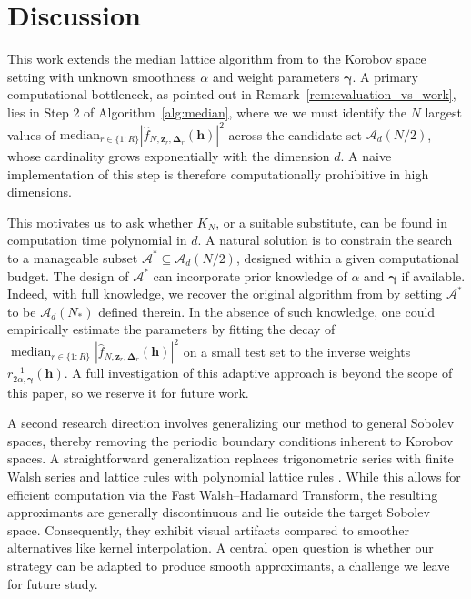 \documentclass[a4paper,11pt]{article}
\newcommand{\bsh}{\boldsymbol{h}}
\newcommand{\bsz}{\boldsymbol{z}}
\newcommand{\bsgamma}{\boldsymbol{\gamma}}
\newcommand{\bsDelta}{\boldsymbol{\Delta}}
\newcommand{\Acal}{\mathcal{A}}
\begin{document}
\section{Discussion}\label{sec:discussion}

This work extends the median lattice algorithm from \cite{PKG24} to the Korobov space setting with unknown smoothness $\alpha$ and weight parameters $\bsgamma$. A primary computational bottleneck, as pointed out in Remark~\ref{rem:evaluation_vs_work}, lies in Step 2 of Algorithm~\ref{alg:median}, where we we must identify the $N$ largest values of $\mathrm{median}_{r\in\{1{:}R\}}|\widehat{f}_{N,\bsz_r,\bsDelta_r}(\bsh)|^2$ across the candidate set $\Acal_{d}(N/2)$, whose cardinality grows exponentially with the dimension $d$. A naive implementation of this step is therefore computationally prohibitive in high dimensions.

This motivates us to ask whether $K_N$, or a suitable substitute, can be found in computation time polynomial in $d$. A natural solution is to constrain the search to a manageable subset $\Acal^*\subseteq \Acal_{d}(N/2)$, designed within a given computational budget. The design of $\Acal^*$ can incorporate prior knowledge of $\alpha$ and $\bsgamma$ if available. Indeed, with full knowledge, we recover the original algorithm from \cite{PKG24} by setting $\Acal^*$ to be $\Acal_d(N_*)$ defined therein.  In the absence of such knowledge, one could empirically estimate the parameters by fitting the decay of $\operatorname*{median}_{r\in\{1{:}R\}}| \widehat{f}_{N,\bsz_r,\bsDelta_r}(\bsh)|^2$ on a small test set to the inverse weights $r^{-1}_{2\alpha,\bsgamma}(\bsh)$. A full investigation of this adaptive approach is beyond the scope of this paper, so we reserve it for future work.

A second research direction involves generalizing our method to general Sobolev spaces, thereby removing the periodic boundary conditions inherent to Korobov spaces. A straightforward generalization replaces trigonometric series with finite Walsh series and lattice rules with polynomial lattice rules \cite{dick:pill:2010}. While this allows for efficient computation via the Fast Walsh–Hadamard Transform, the resulting approximants are generally discontinuous and lie outside the target Sobolev space. Consequently, they exhibit visual artifacts compared to smoother alternatives like kernel interpolation. A central open question is whether our strategy can be adapted to produce smooth approximants, a challenge we leave for future study.
\end{document}
